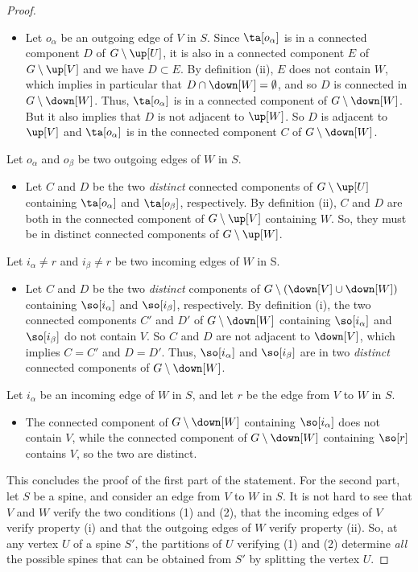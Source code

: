 \documentclass{amsart}
\theoremstyle{definition}
\begin{document}
\begin{proof}
\begin{itemize}
    \item Let $o_\alpha$ be an outgoing edge of $V$ in $S$. Since $\ta[o_\alpha]$ is in a connected component $D$ of $G \setminus \up[U]$, it is also in a connected component $E$ of $G \setminus \up[V]$ and we have $D\subset E$. By definition (ii), $E$ does not contain $W$, which implies in particular that $D \cap \down[W]=\emptyset$, and so $D$ is connected in $G \setminus \down[W]$. Thus, $\ta[o_\alpha]$ is in a connected component of $G \setminus \down[W]$. But it also implies that $D$ is not adjacent to $\up[W]$. So $D$ is adjacent to $\up[V]$ and $\ta[o_\alpha]$ is in the connected component $C$ of $G \setminus \down[W]$. 
  \end{itemize}
  Let $o_\alpha$ and $o_\beta$ be two outgoing edges of $W$ in $S$. 
  \begin{itemize}
    \item Let $C$ and $D$ be the two \emph{distinct} connected components of $G \setminus \up[U]$ containing $\ta[o_\alpha]$ and $\ta[o_\beta]$, respectively. By definition (ii), $C$ and $D$ are both in the connected component of $G \setminus \up[V]$ containing $W$. So, they must be in distinct connected components of $G \setminus \up[W]$. 
  \end{itemize}
  Let $i_\alpha \neq r$ and $i_\beta \neq r$ be two incoming edges of $W$ in S.
  \begin{itemize}
    \item Let $C$ and $D$ be the two \emph{distinct} components of $G\setminus(\down[V]\cup\down[W])$ containing $\so[i_\alpha]$ and $\so[i_\beta]$, respectively. By definition (i), the two connected components $C'$ and $D'$ of $G \setminus \down[W]$ containing $\so[i_\alpha]$ and $\so[i_\beta]$ do not contain $V$. So $C$ and $D$ are not adjacent to $\down[V]$, which implies $C=C'$ and $D=D'$. Thus, $\so[i_\alpha]$ and $\so[i_\beta]$ are in two \emph{distinct} connected components of $G \setminus \down[W]$.
  \end{itemize}
  Let $i_\alpha$ be an incoming edge of $W$ in $S$, and let $r$ be the edge from $V$ to $W$ in $S$.
  \begin{itemize}
    \item The connected component of $G \setminus \down[W]$ containing $\so[i_\alpha]$ does not contain $V$, while the connected component of $G \setminus \down[W]$ containing $\so[r]$ contains $V$, so the two are distinct.
  \end{itemize}
  This concludes the proof of the first part of the statement. For the second part, let $S$ be a spine, and consider an edge from $V$ to $W$ in $S$. It is not hard to see that $V$ and $W$ verify the two conditions (1) and (2), that the incoming edges of $V$ verify property (i) and that the outgoing edges of $W$ verify property (ii). So, at any vertex $U$ of a spine $S'$, the partitions of $U$ verifying (1) and (2) determine \emph{all} the possible spines that can be obtained from $S'$ by splitting the vertex $U$.
\end{proof}
  
\end{document}
